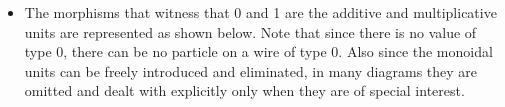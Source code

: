 \documentclass{llncs}
\begin{document}
\begin{itemize}
\item The morphisms that witness that {{0}} and {{1}} are the additive and
  multiplicative units are represented as shown below. Note that since there
  is no value of type 0, there can be no particle on a wire of type {{0}}.
  Also since the monoidal units can be freely introduced and eliminated, in
  many diagrams they are omitted and dealt with explicitly only when they are
  of special interest.
\begin{multicols}{4}
\begin{center}
\end{center}
\begin{center}
\end{center}  
\begin{center}
\end{center}
\columnbreak
\begin{center}
\end{center}
\end{multicols}


\end{itemize}
\end{document}
